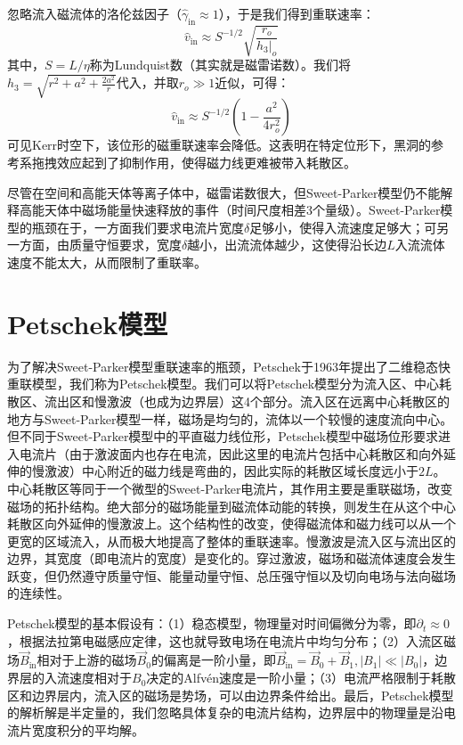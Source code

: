 \documentclass[lang=cn,color=blue,cm,11pt,scheme=chinese,bibend=bibtex,sorting=nty]{elegantbook}
\begin{document}
	忽略流入磁流体的洛伦兹因子（$\hat{\gamma}_{\text{in}} \approx 1$），于是我们得到重联速率：
	\begin{equation}
		\hat{v}_{\text{in}} \approx S^{- 1 / 2} \sqrt{\frac{r_o}{h_3 |_o}}
	\end{equation}
	其中，$S = L / \eta$称为Lundquist数（其实就是磁雷诺数）。我们将$h_3 = \sqrt{r^2 + a^2 + \frac{2 a^2}{r}}$代入，并取$r_o \gg 1$近似，可得：
	\begin{equation}
		\hat{v}_{\text{in}} \approx S^{- 1 / 2} \left( 1 - \frac{a^2}{4 r^2_o} \right)
	\end{equation}
	可见Kerr时空下，该位形的磁重联速率会降低。这表明在特定位形下，黑洞的参考系拖拽效应起到了抑制作用，使得磁力线更难被带入耗散区。
	
	尽管在空间和高能天体等离子体中，磁雷诺数很大，但Sweet-Parker模型仍不能解释高能天体中磁场能量快速释放的事件（时间尺度相差3个量级）。Sweet-Parker模型的瓶颈在于，一方面我们要求电流片宽度$\delta$足够小，使得入流速度足够大；可另一方面，由质量守恒要求，宽度$\delta$越小，出流流体越少，这使得沿长边$L$入流流体速度不能太大，从而限制了重联率。
	
	\section{Petschek模型}
	
	为了解决Sweet-Parker模型重联速率的瓶颈，Petschek于1963年提出了二维稳态快重联模型，我们称为Petschek模型。我们可以将Petschek模型分为流入区、中心耗散区、流出区和慢激波（也成为边界层）这4个部分。流入区在远离中心耗散区的地方与Sweet-Parker模型一样，磁场是均匀的，流体以一个较慢的速度流向中心。但不同于Sweet-Parker模型中的平直磁力线位形，Petschek模型中磁场位形要求进入电流片（由于激波面内也存在电流，因此这里的电流片包括中心耗散区和向外延伸的慢激波）中心附近的磁力线是弯曲的，因此实际的耗散区域长度远小于$2L$。中心耗散区等同于一个微型的Sweet-Parker电流片，其作用主要是重联磁场，改变磁场的拓扑结构。绝大部分的磁场能量到磁流体动能的转换，则发生在从这个中心耗散区向外延伸的慢激波上。这个结构性的改变，使得磁流体和磁力线可以从一个更宽的区域流入，从而极大地提高了整体的重联速率。慢激波是流入区与流出区的边界，其宽度（即电流片的宽度）是变化的。穿过激波，磁场和磁流体速度会发生跃变，但仍然遵守质量守恒、能量动量守恒、总压强守恒以及切向电场与法向磁场的连续性。
	
	Petschek模型的基本假设有：（1）稳态模型，物理量对时间偏微分为零，即$\partial_t \approx 0$，根据法拉第电磁感应定律，这也就导致电场在电流片中均匀分布；（2）入流区磁场$\vec{B}_{\text{in}}$相对于上游的磁场$\vec{B}_0$的偏离是一阶小量，即$\vec{B}_{\text{in}} = \vec{B}_0 + \vec{B}_1, | B_1 | \ll | B_0 |$，边界层的入流速度相对于$B_0$决定的Alfvén速度是一阶小量；（3）电流严格限制于耗散区和边界层内，流入区的磁场是势场，可以由边界条件给出。最后，Petschek模型的解析解是半定量的，我们忽略具体复杂的电流片结构，边界层中的物理量是沿电流片宽度积分的平均解。
	
\end{document}
